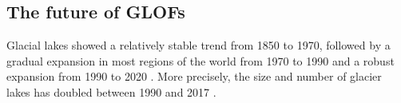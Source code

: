 

\subsection{The future of GLOFs}

Glacial lakes showed a relatively stable trend from 1850 to 1970, followed by a gradual expansion in most regions of the world from 1970 to 1990 and a robust expansion from 1990 to 2020 \citep{Zhang&al2024}. More precisely, the size and number of glacier lakes has doubled between 1990 and 2017 \citep{Shugar&al2020}. %
